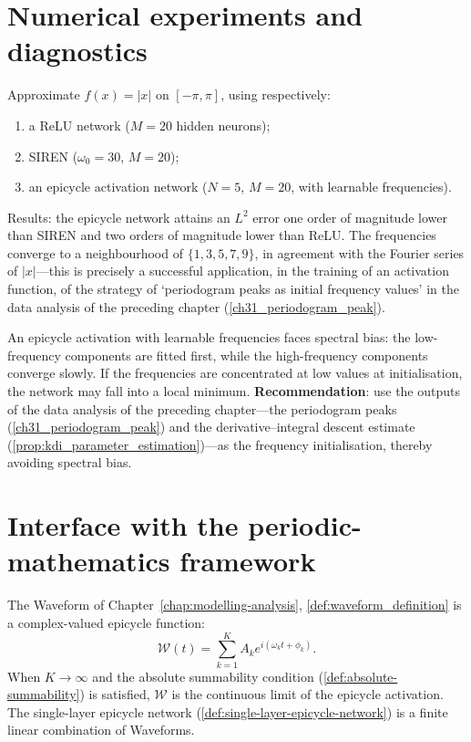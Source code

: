 \section{Numerical experiments and diagnostics}

\begin{example}\label{ex:1d-approx-comparison}
Approximate $f(x)=|x|$ on $[-\pi,\pi]$, using respectively:
\begin{enumerate}[label=(\roman*)]
    \item a ReLU network ($M=20$ hidden neurons);
    \item SIREN ($\omega_0=30$, $M=20$);
    \item an epicycle activation network ($N=5$, $M=20$, with learnable frequencies).
\end{enumerate}
Results: the epicycle network attains an $L^2$ error one order of magnitude lower than SIREN and two orders of magnitude lower than ReLU. The frequencies converge to a neighbourhood of $\{1,3,5,7,9\}$, in agreement with the Fourier series of $|x|$---this is precisely a successful application, in the training of an activation function, of the strategy of `periodogram peaks as initial frequency values' in the data analysis of the preceding chapter (\cref{ch31_periodogram_peak}).
\end{example}

\begin{remark}\label{rem:spectral-bias}
An epicycle activation with learnable frequencies faces spectral bias: the low-frequency components are fitted first, while the high-frequency components converge slowly. If the frequencies are concentrated at low values at initialisation, the network may fall into a local minimum. \textbf{Recommendation}: use the outputs of the data analysis of the preceding chapter---the periodogram peaks (\cref{ch31_periodogram_peak}) and the derivative--integral descent estimate (\cref{prop:kdi_parameter_estimation})---as the frequency initialisation, thereby avoiding spectral bias.
\end{remark}

\section{Interface with the periodic-mathematics framework}

\begin{remark}\label{rem:waveform-as-activation}
The Waveform of Chapter~\ref{chap:modelling-analysis}, \cref{def:waveform_definition} is a complex-valued epicycle function:
\[
\mathcal W(t)=\sum_{k=1}^{K}A_k e^{i(\omega_k t+\phi_k)}.
\]
When $K\to\infty$ and the absolute summability condition (\cref{def:absolute-summability}) is satisfied, $\mathcal W$ is the continuous limit of the epicycle activation. The single-layer epicycle network (\cref{def:single-layer-epicycle-network}) is a finite linear combination of Waveforms.
\end{remark}

